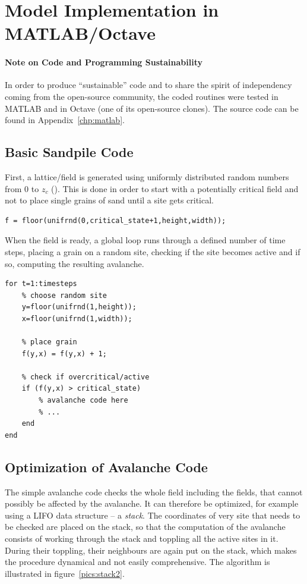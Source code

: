 \chapter{Model Implementation in MATLAB/Octave}
\thispagestyle{fancy}

\subsubsection{Note on Code and Programming Sustainability}
In order to produce  ``sustainable'' code and to share the spirit of independency coming from the open-source community, the coded routines were tested in MATLAB and in Octave (one of its open-source clones). The source code can be found in Appendix~\ref{chp:matlab}.

\section{Basic Sandpile Code}
First, a lattice/field is generated using uniformly distributed random numbers from 0 to $z_c$ (). This is done in order to start with a potentially critical field and not to place single grains of sand until a site gets critical.
\begin{lstlisting}
f = floor(unifrnd(0,critical_state+1,height,width));
\end{lstlisting}

When the field is ready, a global loop runs through a defined number of time steps, placing a grain on a random site, checking if the site becomes active and if so, computing the resulting avalanche.
\begin{lstlisting}
for t=1:timesteps
	% choose random site
	y=floor(unifrnd(1,height));
	x=floor(unifrnd(1,width));

	% place grain
	f(y,x) = f(y,x) + 1;

	% check if overcritical/active
	if (f(y,x) > critical_state)
		% avalanche code here
		% ...
	end
end
\end{lstlisting}

\section{Optimization of Avalanche Code}
The simple avalanche code checks the whole field including the fields, that cannot possibly be affected by the avalanche. It can therefore be optimized, for example using a LIFO data structure -- a \emph{stack}. The coordinates of very site that needs to be checked are placed on the stack, so that the computation of the avalanche consists of working through the stack and toppling all the active sites in it. During their toppling, their neighbours are again put on the stack, which makes the procedure dynamical and not easily comprehensive. The algorithm is illustrated in figure~\ref{pics:stack2}.

